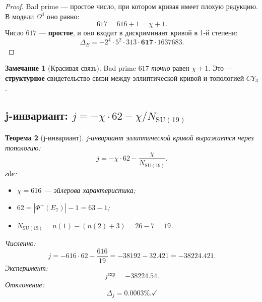 \documentclass[11pt,a4paper]{article}
\newcommand{\SU}{\mathrm{SU}}
\newcommand{\CY}{CY_3}
\newcommand{\Om}{\Omega^4}
\newtheorem{theorem}{Теорема}[section]
\theoremstyle{definition}
\newtheorem{remark}[theorem]{Замечание}
\begin{document}
\begin{proof}
Bad prime — простое число, при котором кривая имеет 
плохую редукцию. В модели $\Om$ оно равно:
\begin{equation}
    617 = 616 + 1 = \chi + 1.
\end{equation}
Число $617$ — \textbf{простое}, и оно входит в дискриминант 
кривой в 1-й степени:
\begin{equation}
    \Delta_E = -2^4 \cdot 5^2 \cdot 313 \cdot \mathbf{617} 
    \cdot 1637683.
\end{equation}
\end{proof}

\begin{remark}[Красивая связь]
\label{rem:bad-prime-beauty}
Bad prime $617$ \emph{точно} равен $\chi + 1$. Это — 
\textbf{структурное} свидетельство связи между эллиптической 
кривой и топологией $\CY$.
\end{remark}

\subsection{j-инвариант: $j = -\chi \cdot 62 - \chi/N_{\SU(19)}$}
\label{subsec:j-invariant}

\begin{theorem}[j-инвариант]
\label{thm:j-invariant}
j-инвариант эллиптической кривой выражается через 
топологию:
\begin{equation}
    \boxed{
    j = -\chi \cdot 62 - \frac{\chi}{N_{\SU(19)}}.
    }
    \label{eq:j-invariant}
\end{equation}
где:
\begin{itemize}
    \item $\chi = 616$ — эйлерова характеристика;
    \item $62 = |\Phi^+(E_7)| - 1 = 63 - 1$;
    \item $N_{\SU(19)} = n(1) - (n(2) + 3) = 26 - 7 = 19$.
\end{itemize}
Численно:
\begin{equation}
    j = -616 \cdot 62 - \frac{616}{19} 
      = -38192 - 32.421 
      = -38224.421.
\end{equation}
Эксперимент:
\begin{equation}
    j^{\text{exp}} = -38224.54.
\end{equation}
Отклонение:
\begin{equation}
    \Delta_j = \mathbf{0.0003\%}. \checkmark
\end{equation}
\end{theorem}
\end{document}
